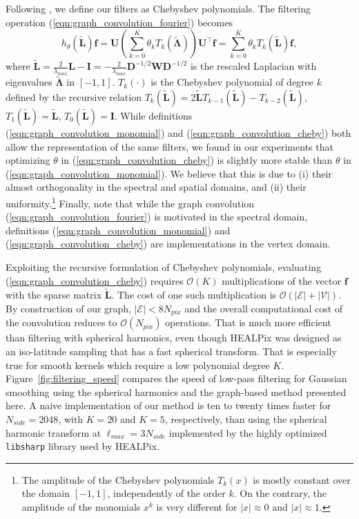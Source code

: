 \documentclass[final,twocolumn,3p,times,sort&compress]{elsarticle}
\newcommand{\figref}[1]{Figure~\ref{fig:#1}}
\newcommand{\eqnref}[1]{(\ref{eqn:#1})}
\renewcommand{\b}[1]{{\bm{#1}}}   %
\newcommand{\1}{\b{1}}              %
\newcommand{\0}{\b{0}}              %
\newcommand{\V}{\mathcal{V}}
\newcommand{\E}{\mathcal{E}}
\renewcommand{\L}{\b{L}}
\newcommand{\tL}{\tilde{\L}}
\newcommand{\W}{\b{W}}
\newcommand{\D}{\b{D}}
\newcommand{\U}{\b{U}}
\newcommand{\f}{\b{f}}
\newcommand{\trans}{^\intercal}
\newcommand{\bLambda}{\b{\Lambda}}
\newcommand{\bO}{\mathcal{O}}
\newcommand{\pkg}[1]{\texttt{#1}}
\begin{document}
Following \citep{defferrard2016convolutional}, we define our filters as Chebyshev polynomials.
The filtering operation \eqnref{graph_convolution_fourier} becomes
\begin{equation} \label{eqn:graph_convolution_cheby}
	h_\theta\left(\tL\right) \f = \U \left(\sum_{k=0}^K \theta_k T_k\left(\tilde{\bLambda}\right) \right) \U\trans \f = \sum_{k=0}^K \theta_k T_k\left(\tL\right) \f,
\end{equation}
where $\tL = \frac{2}{\lambda_{max}} \L - \b{I} = -\frac{2}{\lambda_{max}} \D^{-1/2} \W \D^{-1/2}$ is the rescaled Laplacian with eigenvalues $\tilde{\b \Lambda}$ in $[-1, 1]$.
$T_k(\cdot)$ is the Chebyshev polynomial of degree $k$ defined by the recursive relation $T_k(\tL) = 2\tL T_{k-1}(\tL) - T_{k-2}(\tL)$, $T_1(\tL) = \tL$, $T_0(\tL) = \b{I}$.
While definitions \eqnref{graph_convolution_monomial} and \eqnref{graph_convolution_cheby} both allow the representation of the same filters, we found in our experiments that optimizing $\theta$ in \eqnref{graph_convolution_cheby} is slightly more stable than $\theta$ in \eqnref{graph_convolution_monomial}.
We believe that this is due to (i) their almost orthogonality in the spectral and spatial domains, and (ii) their uniformity.\footnote{The amplitude of the Chebyshev polynomials $T_k(x)$ is mostly constant over the domain $[-1, 1]$, independently of the order $k$. On the contrary, the amplitude of the monomials $x^k$ is very different for $|x|\approx 0$ and $|x| \approx 1$.}
Finally, note that while the graph convolution \eqnref{graph_convolution_fourier} is motivated in the spectral domain, definitions \eqnref{graph_convolution_monomial} and \eqnref{graph_convolution_cheby} are implementations in the vertex domain.

Exploiting the recursive formulation of Chebyshev polynomials, evaluating \eqnref{graph_convolution_cheby} requires $\bO(K)$ multiplications of the vector $\f$ with the sparse matrix $\tL$.
The cost of one such multiplication is $\bO(|\E| + |\V|)$.
By construction of our graph, $|\E| < 8 N_{pix}$ and the overall computational cost of the convolution reduces to $\bO(N_{pix})$ operations.
That is much more efficient than filtering with spherical harmonics, even though HEALPix was designed as an iso-latitude sampling that has a fast spherical transform.
That is especially true for smooth kernels which require a low polynomial degree $K$.
\figref{filtering_speed} compares the speed of low-pass filtering for Gaussian smoothing using the spherical harmonics and the graph-based method presented here.
A naive implementation of our method is ten to twenty times faster for $N_{side} = 2048$, with $K=20$ and $K=5$, respectively, than using the spherical harmonic transform at $\ell_{max} = 3 N_{side}$ implemented by the highly optimized \pkg{libsharp} \citep{reinecke2013libsharp} library used by HEALPix.
\end{document}
